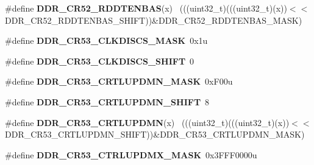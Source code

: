 \begin{DoxyCompactItemize}
\item 
\hypertarget{group___d_d_r___register___masks_ga0ae16d31fe5edcadfd8b621450b05bd2}{}\#define {\bfseries D\+D\+R\+\_\+\+C\+R52\+\_\+\+R\+D\+D\+T\+E\+N\+B\+A\+S}(x)                                    ~(((uint32\+\_\+t)(((uint32\+\_\+t)(x))$<$$<$D\+D\+R\+\_\+\+C\+R52\+\_\+\+R\+D\+D\+T\+E\+N\+B\+A\+S\+\_\+\+S\+H\+I\+F\+T))\&D\+D\+R\+\_\+\+C\+R52\+\_\+\+R\+D\+D\+T\+E\+N\+B\+A\+S\+\_\+\+M\+A\+S\+K)\label{group___d_d_r___register___masks_ga0ae16d31fe5edcadfd8b621450b05bd2}

\item 
\hypertarget{group___d_d_r___register___masks_gad7d2d83a6fe176ead1042648f890e1f5}{}\#define {\bfseries D\+D\+R\+\_\+\+C\+R53\+\_\+\+C\+L\+K\+D\+I\+S\+C\+S\+\_\+\+M\+A\+S\+K}~0x1u\label{group___d_d_r___register___masks_gad7d2d83a6fe176ead1042648f890e1f5}

\item 
\hypertarget{group___d_d_r___register___masks_ga411e6746713d5c9088f299f61e303b48}{}\#define {\bfseries D\+D\+R\+\_\+\+C\+R53\+\_\+\+C\+L\+K\+D\+I\+S\+C\+S\+\_\+\+S\+H\+I\+F\+T}~0\label{group___d_d_r___register___masks_ga411e6746713d5c9088f299f61e303b48}

\item 
\hypertarget{group___d_d_r___register___masks_gafe21c6a517b841164322525272d40523}{}\#define {\bfseries D\+D\+R\+\_\+\+C\+R53\+\_\+\+C\+R\+T\+L\+U\+P\+D\+M\+N\+\_\+\+M\+A\+S\+K}~0x\+F00u\label{group___d_d_r___register___masks_gafe21c6a517b841164322525272d40523}

\item 
\hypertarget{group___d_d_r___register___masks_gabed487c85758cf43cafa769f80a5f73a}{}\#define {\bfseries D\+D\+R\+\_\+\+C\+R53\+\_\+\+C\+R\+T\+L\+U\+P\+D\+M\+N\+\_\+\+S\+H\+I\+F\+T}~8\label{group___d_d_r___register___masks_gabed487c85758cf43cafa769f80a5f73a}

\item 
\hypertarget{group___d_d_r___register___masks_ga74358f6e9e32c971e26444673d515a32}{}\#define {\bfseries D\+D\+R\+\_\+\+C\+R53\+\_\+\+C\+R\+T\+L\+U\+P\+D\+M\+N}(x)                                    ~(((uint32\+\_\+t)(((uint32\+\_\+t)(x))$<$$<$D\+D\+R\+\_\+\+C\+R53\+\_\+\+C\+R\+T\+L\+U\+P\+D\+M\+N\+\_\+\+S\+H\+I\+F\+T))\&D\+D\+R\+\_\+\+C\+R53\+\_\+\+C\+R\+T\+L\+U\+P\+D\+M\+N\+\_\+\+M\+A\+S\+K)\label{group___d_d_r___register___masks_ga74358f6e9e32c971e26444673d515a32}

\item 
\hypertarget{group___d_d_r___register___masks_ga7540716487ea4115636ba473e6d68b18}{}\#define {\bfseries D\+D\+R\+\_\+\+C\+R53\+\_\+\+C\+T\+R\+L\+U\+P\+D\+M\+X\+\_\+\+M\+A\+S\+K}~0x3\+F\+F\+F0000u\label{group___d_d_r___register___masks_ga7540716487ea4115636ba473e6d68b18}


\end{DoxyCompactItemize}
